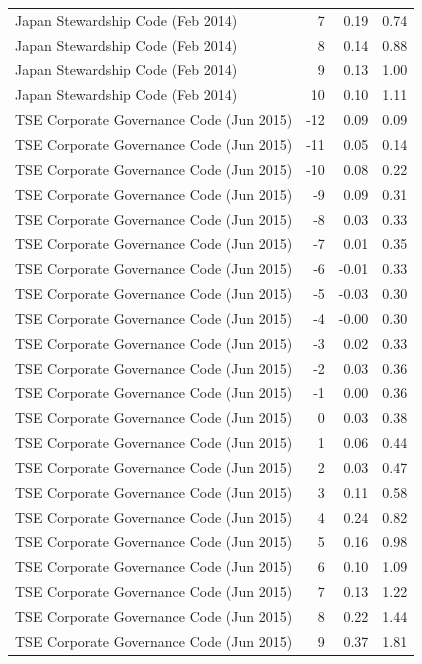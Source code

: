 \begin{table}
\begin{tabular}{lrrr}
Japan Stewardship Code (Feb 2014) & 7 & 0.19 & 0.74 \\
Japan Stewardship Code (Feb 2014) & 8 & 0.14 & 0.88 \\
Japan Stewardship Code (Feb 2014) & 9 & 0.13 & 1.00 \\
Japan Stewardship Code (Feb 2014) & 10 & 0.10 & 1.11 \\
TSE Corporate Governance Code (Jun 2015) & -12 & 0.09 & 0.09 \\
TSE Corporate Governance Code (Jun 2015) & -11 & 0.05 & 0.14 \\
TSE Corporate Governance Code (Jun 2015) & -10 & 0.08 & 0.22 \\
TSE Corporate Governance Code (Jun 2015) & -9 & 0.09 & 0.31 \\
TSE Corporate Governance Code (Jun 2015) & -8 & 0.03 & 0.33 \\
TSE Corporate Governance Code (Jun 2015) & -7 & 0.01 & 0.35 \\
TSE Corporate Governance Code (Jun 2015) & -6 & -0.01 & 0.33 \\
TSE Corporate Governance Code (Jun 2015) & -5 & -0.03 & 0.30 \\
TSE Corporate Governance Code (Jun 2015) & -4 & -0.00 & 0.30 \\
TSE Corporate Governance Code (Jun 2015) & -3 & 0.02 & 0.33 \\
TSE Corporate Governance Code (Jun 2015) & -2 & 0.03 & 0.36 \\
TSE Corporate Governance Code (Jun 2015) & -1 & 0.00 & 0.36 \\
TSE Corporate Governance Code (Jun 2015) & 0 & 0.03 & 0.38 \\
TSE Corporate Governance Code (Jun 2015) & 1 & 0.06 & 0.44 \\
TSE Corporate Governance Code (Jun 2015) & 2 & 0.03 & 0.47 \\
TSE Corporate Governance Code (Jun 2015) & 3 & 0.11 & 0.58 \\
TSE Corporate Governance Code (Jun 2015) & 4 & 0.24 & 0.82 \\
TSE Corporate Governance Code (Jun 2015) & 5 & 0.16 & 0.98 \\
TSE Corporate Governance Code (Jun 2015) & 6 & 0.10 & 1.09 \\
TSE Corporate Governance Code (Jun 2015) & 7 & 0.13 & 1.22 \\
TSE Corporate Governance Code (Jun 2015) & 8 & 0.22 & 1.44 \\
TSE Corporate Governance Code (Jun 2015) & 9 & 0.37 & 1.81 \\

\end{tabular}
\end{table}
